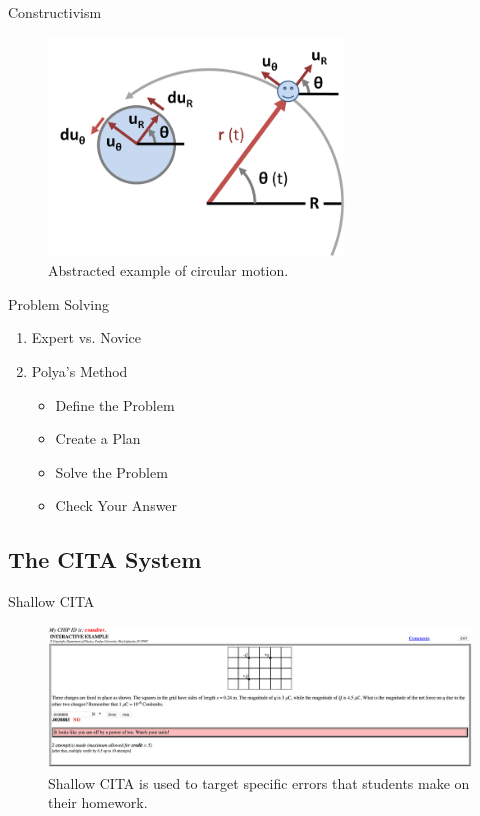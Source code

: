\documentclass[xcolor=x11names,compress]{beamer}
\begin{document}
\begin{frame}{Constructivism}
	\begin{figure}
		\centering
		\includegraphics[width=0.7\textwidth]{img/constructivism_vectors.png}
		\caption{Abstracted example of circular motion.}
		\label{fig:constructivism_example_part_2}
	\end{figure}
\end{frame}

\begin{frame}{Problem Solving}
	\begin{enumerate}
		\item Expert vs. Novice
		\item Polya's Method
		\begin{itemize}
			\item Define the Problem
			\item Create a Plan
			\item Solve the Problem
			\item Check Your Answer
		\end{itemize}
	\end{enumerate}
\end{frame}

\subsection{The CITA System}

\begin{frame}{Shallow CITA}
	\begin{figure}
		\includegraphics[width=1.0\textwidth]{img/shallow_cita_example.png}
		\caption{Shallow CITA is used to target specific errors that students make on their homework.}
		\label{fig:shallow_cita_example}
	\end{figure}
\end{frame}
\end{document}
